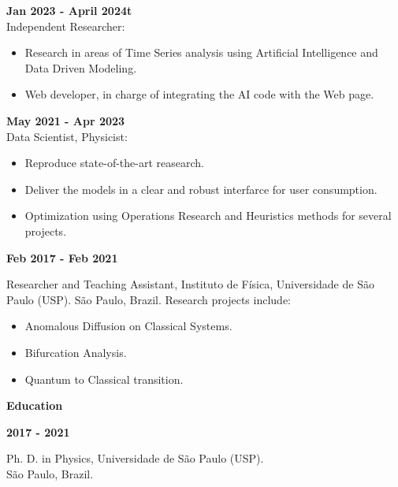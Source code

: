 \documentclass[a4paper,12pt,final]{memoir}
\newcommand{\SmallSep}{\vspace{0.5em}}
\newcommand{\CVSection}[1]
	{\Large\textbf{#1}\par
	\SmallSep\normalsize\normalfont}
\newcommand{\CVItem}[1]
	{\textbf{\color{RoyalBlue} #1}}
\begin{document}
\CVItem{Jan 2023 - April 2024t}\\
{\small Independent Researcher:}
\begin{footnotesize}
\begin{itemize}
\item Research in areas of Time Series analysis using Artificial Intelligence and Data Driven Modeling. 
\item Web developer, in charge of integrating the AI code with the Web page.
\end{itemize}
\end{footnotesize}
\SmallSep

\CVItem{May 2021 - Apr 2023}\\
{\small Data Scientist, Physicist:}
\begin{footnotesize}
\begin{itemize}
\item Reproduce state-of-the-art reasearch.
\item Deliver the models in a clear and robust interfarce for user consumption.
\item Optimization using Operations Research and Heuristics methods for several projects.
\end{itemize}
\end{footnotesize}
\SmallSep

\CVItem{Feb 2017 - Feb 2021}\\
\begin{small}
Researcher and Teaching Assistant,  Instituto de F\'{i}sica, Universidade de S\~{a}o Paulo 
(USP). S\~{a}o Paulo, Brazil. 
Research projects include: 
\end{small}
\begin{footnotesize}
\begin{itemize}
\item Anomalous Diffusion on Classical Systems.
\item Bifurcation Analysis.
\item Quantum to Classical transition.
\end{itemize}
\end{footnotesize}

\SmallSep


\CVSection{Education}
\CVItem{2017 - 2021}\\
\begin{small}
 Ph. D. in Physics, Universidade de S\~{a}o Paulo (USP).\\ 
S\~{a}o Paulo, Brazil.
 \end{small} 
\SmallSep
\end{document}
